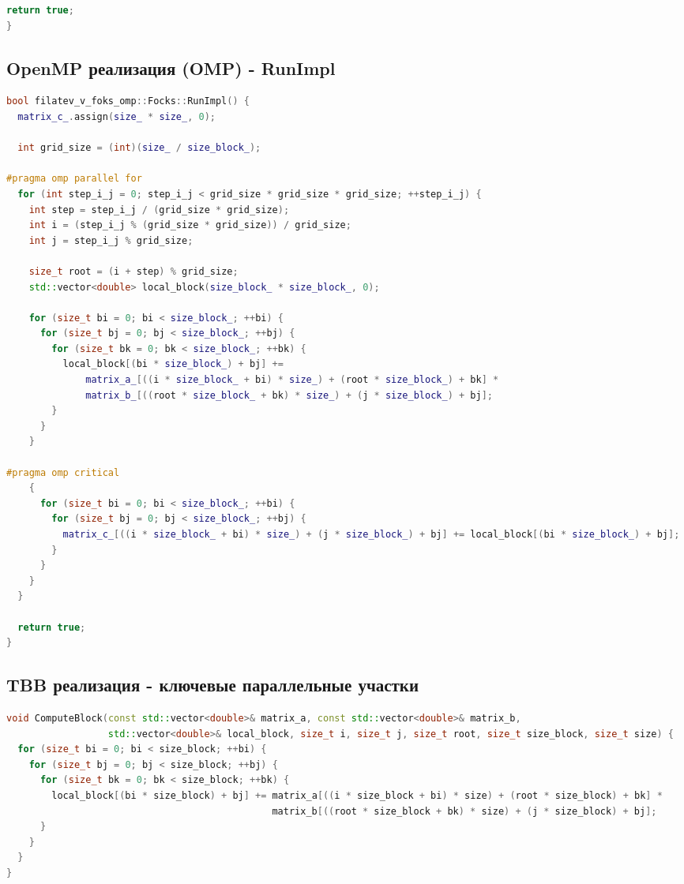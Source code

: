 \documentclass[12pt]{article}
\begin{document}
\begin{thebibliography}{99}
\begin{lstlisting}[language=C++]
  return true;
}
\end{lstlisting}
\newpage

\subsection{OpenMP реализация (OMP) - RunImpl}
\begin{lstlisting}[language=C++]
bool filatev_v_foks_omp::Focks::RunImpl() {
  matrix_c_.assign(size_ * size_, 0);

  int grid_size = (int)(size_ / size_block_);

#pragma omp parallel for
  for (int step_i_j = 0; step_i_j < grid_size * grid_size * grid_size; ++step_i_j) {
    int step = step_i_j / (grid_size * grid_size);
    int i = (step_i_j % (grid_size * grid_size)) / grid_size;
    int j = step_i_j % grid_size;

    size_t root = (i + step) % grid_size;
    std::vector<double> local_block(size_block_ * size_block_, 0);

    for (size_t bi = 0; bi < size_block_; ++bi) {
      for (size_t bj = 0; bj < size_block_; ++bj) {
        for (size_t bk = 0; bk < size_block_; ++bk) {
          local_block[(bi * size_block_) + bj] +=
              matrix_a_[((i * size_block_ + bi) * size_) + (root * size_block_) + bk] *
              matrix_b_[((root * size_block_ + bk) * size_) + (j * size_block_) + bj];
        }
      }
    }

#pragma omp critical
    {
      for (size_t bi = 0; bi < size_block_; ++bi) {
        for (size_t bj = 0; bj < size_block_; ++bj) {
          matrix_c_[((i * size_block_ + bi) * size_) + (j * size_block_) + bj] += local_block[(bi * size_block_) + bj];
        }
      }
    }
  }

  return true;
}
\end{lstlisting}
\newpage

\subsection{TBB реализация - ключевые параллельные участки}
\begin{lstlisting}[language=C++]
void ComputeBlock(const std::vector<double>& matrix_a, const std::vector<double>& matrix_b,
                  std::vector<double>& local_block, size_t i, size_t j, size_t root, size_t size_block, size_t size) {
  for (size_t bi = 0; bi < size_block; ++bi) {
    for (size_t bj = 0; bj < size_block; ++bj) {
      for (size_t bk = 0; bk < size_block; ++bk) {
        local_block[(bi * size_block) + bj] += matrix_a[((i * size_block + bi) * size) + (root * size_block) + bk] *
                                               matrix_b[((root * size_block + bk) * size) + (j * size_block) + bj];
      }
    }
  }
}


\end{lstlisting}
\end{thebibliography}
\end{document}
